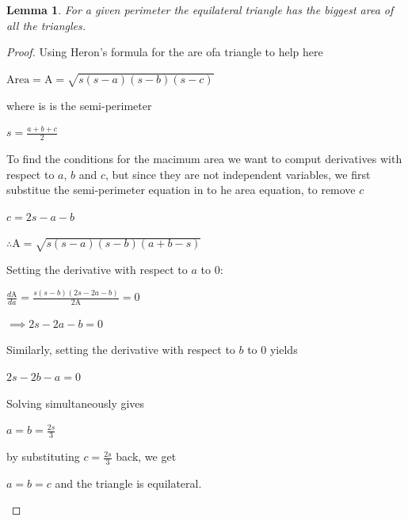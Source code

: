\documentclass[a4paper]{book}
\newtheorem{lemma}[theorem]{Lemma}%
\numberwithin{theorem}{section}%
\begin{document}
\begin{lemma}
    For a given perimeter the equilateral triangle has the biggest area of all the triangles. 
\end{lemma}
\begin{proof} 
    Using Heron's formula for the are ofa triangle to help here
    \begin{center}
        $\displaystyle \mathrm{Area}=\mathrm{A}=\sqrt{s(s-a)(s-b)(s-c)}$
    \end{center}
    where is is the semi-perimeter
    \begin{center}
        $\displaystyle s=\frac{a+b+c}{2}$
    \end{center}
    To find the conditions for the macimum area we want to comput derivatives with respect to $a$, $b$ and $c$, but since they are not independent variables, we first substitue the semi-perimeter equation in to he area equation, to remove $c$
    \begin{center}
        $\displaystyle c=2s-a-b$

        $\displaystyle \therefore\mathrm{A}=\sqrt{s(s-a)(s-b)(a+b-s)}$
    \end{center}
    Setting the derivative with respect to $a$ to $0$:
    \begin{center}
        $\displaystyle \frac{d\mathrm{A}}{da}=\frac{s(s-b)(2s-2a-b)}{2\mathrm{A}}=0$

        $\displaystyle \implies 2s-2a-b=0$
    \end{center}
    Similarly, setting the derivative with respect to $b$ to $0$ yields
    \begin{center}
        $2s-2b-a=0$
    \end{center}
    Solving simultaneously gives
    \begin{center}
        $\displaystyle a=b=\frac{2s}{3}$
    \end{center}
    by substituting $\displaystyle c=\frac{2s}{3}$ back, we get
    \begin{center}
        $\displaystyle a=b=c$ and the triangle is equilateral.
    \end{center}
\end{proof}
\end{document}
